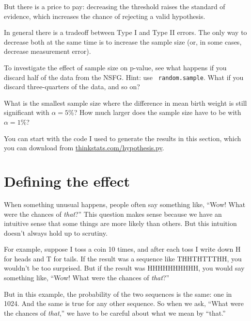 \documentclass[12pt]{book}
\begin{document}
But there is a price to pay: decreasing the threshold raises the
standard of evidence, which increases the chance of rejecting
a valid hypothesis.

In general there is a tradeoff between Type I and Type II errors.
The only way to decrease both at the same time is to increase the
sample size (or, in some cases, decrease measurement error).


\begin{exercise}
To investigate the effect of sample size on p-value, see what happens
if you discard half of the data from the NSFG.  Hint: use {\tt
  random.sample}.  What if you discard three-quarters of the data, and
so on?


What is the smallest sample size where the difference in mean birth
weight is still significant with $\alpha=5$\%?  How much
larger does the sample size have to be with $\alpha=1$\%?

You can start with the code I used to generate the results in this
section, which you can download from \url{thinkstats.com/hypothesis.py}.


\end{exercise}


\section{Defining the effect}

When something unusual happens, people often say something like,
``Wow!  What were the chances of {\em that}?''  This question makes
sense because we have an intuitive sense that some things are more
likely than others.  But this intuition doesn't always hold up to
scrutiny.


For example, suppose I toss a coin 10 times, and after each toss I
write down H for heads and T for tails.  If the result was a sequence
like THHTHTTTHH, you wouldn't be too surprised.  But if the result was
HHHHHHHHHH, you would say something like, ``Wow!  What were the
chances of {\em that}?''

But in this example, the probability of the two sequences is the
same: one in 1024.  And the same is true for any other sequence.
So when we ask, ``What were the chances of {\em that},'' we have
to be careful about what we mean by ``that.''
\end{document}
